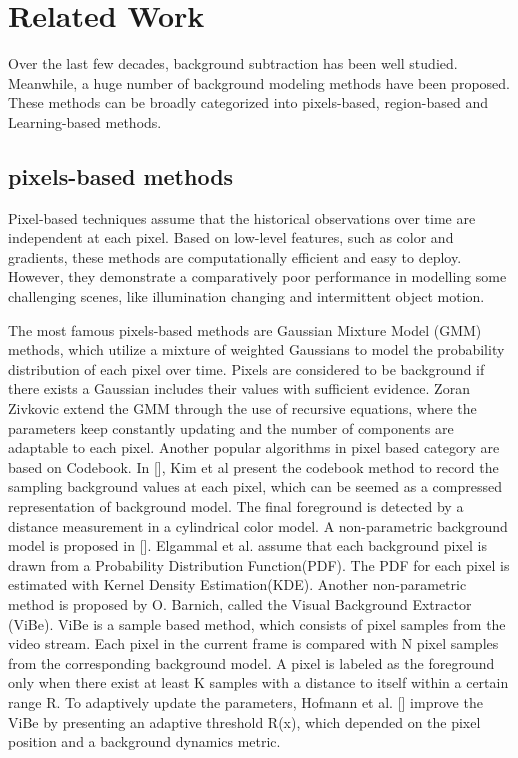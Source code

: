 \documentclass[journal]{IEEEtran}
\begin{document}
\section{Related Work}
\cite{Bouwmans2014}
Over the last few decades, background subtraction has been well studied. Meanwhile, a huge number of background modeling methods have been proposed. 
These methods can be broadly categorized into pixels-based, region-based and Learning-based methods.
\subsection{pixels-based methods}
Pixel-based techniques assume that the historical observations over time are independent at each pixel. Based on low-level features, such as color and gradients, these methods are computationally efficient and easy to deploy. However, they demonstrate a comparatively poor performance in modelling some challenging scenes, like illumination changing and intermittent object motion.

The most famous pixels-based methods are Gaussian Mixture Model (GMM) methods, which utilize a mixture of weighted Gaussians to model the probability distribution of each pixel over time. Pixels are considered to be background if there exists a Gaussian includes their values with sufficient evidence. 
Zoran Zivkovic extend the GMM through the use of recursive equations, where the parameters keep constantly updating and the number of components are adaptable to each pixel. 
Another popular algorithms in pixel based category are based on Codebook. In [], Kim et al present the codebook method to record the sampling background values at each pixel, which can be seemed as a compressed representation of background model. The final foreground is detected by a distance measurement in a cylindrical color model.
A non-parametric background model is proposed in []. Elgammal et al. assume that each background pixel is drawn from a Probability Distribution Function(PDF). The PDF for each pixel is estimated with Kernel Density Estimation(KDE). 
Another non-parametric method is proposed by O. Barnich, called the Visual Background Extractor (ViBe). ViBe is a sample based method, which consists of pixel samples from the video stream. Each pixel in the current frame is compared with N pixel samples from the corresponding background model. A pixel is labeled as the foreground only when there exist at least K samples with a distance to itself within a certain range R. 
To adaptively update the parameters, Hofmann et al. [] improve the ViBe by presenting an adaptive threshold R(x), which depended on the pixel position and a background dynamics metric.
%
\end{document}
